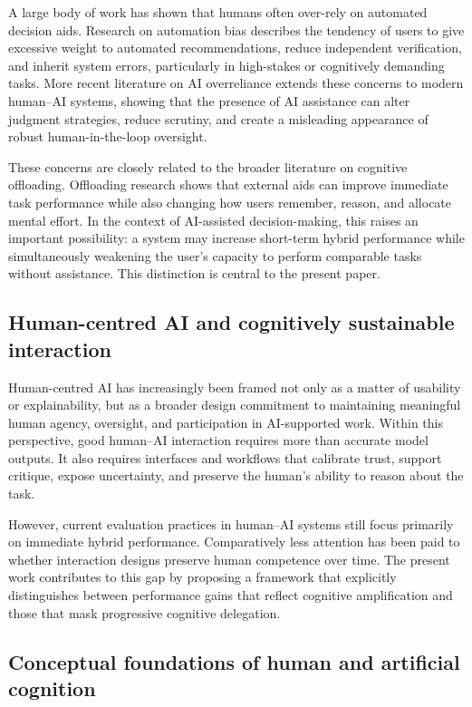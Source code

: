 \documentclass[11pt]{article}
\begin{document}
A large body of work has shown that humans often over-rely on automated
decision aids. Research on automation bias describes the tendency of
users to give excessive weight to automated recommendations, reduce
independent verification, and inherit system errors, particularly in
high-stakes or cognitively demanding tasks. More recent literature on
AI overreliance extends these concerns to modern human--AI systems,
showing that the presence of AI assistance can alter judgment strategies,
reduce scrutiny, and create a misleading appearance of robust
human-in-the-loop oversight.

These concerns are closely related to the broader literature on cognitive
offloading. Offloading research shows that external aids can improve
immediate task performance while also changing how users remember,
reason, and allocate mental effort. In the context of AI-assisted
decision-making, this raises an important possibility: a system may
increase short-term hybrid performance while simultaneously weakening
the user's capacity to perform comparable tasks without assistance.
This distinction is central to the present paper.

\subsection{Human-centred AI and cognitively sustainable interaction}

Human-centred AI has increasingly been framed not only as a matter of
usability or explainability, but as a broader design commitment to
maintaining meaningful human agency, oversight, and participation in
AI-supported work. Within this perspective, good human--AI interaction
requires more than accurate model outputs. It also requires interfaces
and workflows that calibrate trust, support critique, expose uncertainty,
and preserve the human's ability to reason about the task.

However, current evaluation practices in human--AI systems still focus
primarily on immediate hybrid performance. Comparatively less attention
has been paid to whether interaction designs preserve human competence
over time. The present work contributes to this gap by proposing a
framework that explicitly distinguishes between performance gains that
reflect cognitive amplification and those that mask progressive cognitive
delegation.

\subsection{Conceptual foundations of human and artificial cognition}
\end{document}
